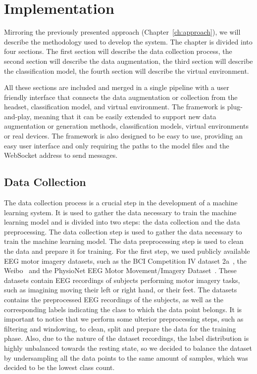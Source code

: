 \chapter{Implementation}\label{ch:methodology}
Mirroring the previously presented approach (Chapter~\ref{ch:approach}), we will describe the methodology used to develop the system.
The chapter is divided into four sections.
The first section will describe the data collection process, the second section will describe the data augmentation, the third section will describe the classification model, the fourth section will describe the virtual environment.

All these sections are included and merged in a single pipeline with a user friendly interface that connects the data augmentation or collection from the headset, classification model, and virtual environment.
The framework is plug-and-play, meaning that it can be easily extended to support new data augmentation or generation methods, classification models, virtual environments or real devices.
The framework is also designed to be easy to use, providing an easy user interface and only requiring the paths to the model files and the WebSocket address to send messages.


\section{Data Collection}
The data collection process is a crucial step in the development of a machine learning system.
It is used to gather the data necessary to train the machine learning model and is divided into two steps: the data collection and the data preprocessing.
The data collection step is used to gather the data necessary to train the machine learning model.
The data preprocessing step is used to clean the data and prepare it for training.
For the first step, we used publicly available EEG motor imagery datasets, such as the BCI Competition IV dataset 2a~\cite{tangermann2012review}, the Weibo~\cite{yi2014evaluation} and the PhysioNet EEG Motor Movement/Imagery Dataset~\cite{goldberger2000physiobank, schalk2004bci2000}.
These datasets contain EEG recordings of subjects performing motor imagery tasks, such as imagining moving their left or right hand, or their feet.
The datasets contains the preprocessed EEG recordings of the subjects, as well as the corresponding labels indicating the class to which the data point belongs.
It is important to notice that we perform some ulterior preprocessing steps, such as filtering and windowing, to clean, split and prepare the data for the training phase.
Also, due to the nature of the dataset recordings, the label distribution is highly unbalanced towards the resting state, so we decided to balance the dataset by undersampling all the data points to the same amount of samples, which was decided to be the lowest class count.
